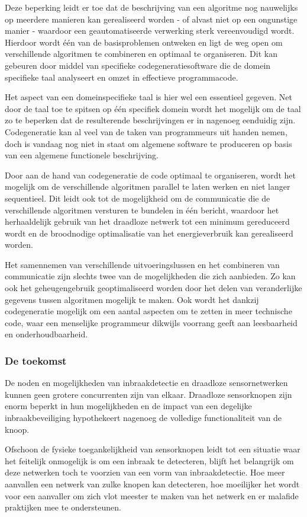\documentclass[DIV=calc,paper=a4,fontsize=11pt,twocolumn,draft]{scrartcl}
\newcommand{\heading}[1]{
\subsubsection*{#1}
\vspace{-2mm}
}
\begin{document}
Deze beperking leidt er toe dat de beschrijving van een algoritme nog
nauwelijks op meerdere manieren kan gerealiseerd worden - of alvast niet op een
ongunstige manier - waardoor een geautomatiseerde verwerking sterk
vereenvoudigd wordt. Hierdoor wordt \'e\'en van de basisproblemen ontweken en
ligt de weg open om verschillende algoritmen te combineren en optimaal
te organiseren. Dit kan gebeuren door middel van specifieke
codegeneratiesoftware die de domein specifieke taal analyseert en omzet in
effectieve programmacode.

Het aspect van een domeinspecifieke taal is hier wel een essentieel gegeven.
Net door de taal toe te spitsen op \'e\'en specifiek domein wordt het mogelijk
om de taal zo te beperken dat de resulterende beschrijvingen er in nagenoeg
eenduidig zijn. Codegeneratie kan al veel van de taken van programmeurs uit
handen nemen, doch is vandaag nog niet in staat om algemene software te
produceren op basis van een algemene functionele beschrijving.

Door aan de hand van codegeneratie de code optimaal te organiseren, wordt het
mogelijk om de verschillende algoritmen parallel te laten werken en niet langer
sequentieel. Dit leidt ook tot de mogelijkheid om de communicatie die de
verschillende algoritmen versturen te bundelen in \'e\'en bericht, waardoor het
herhaaldelijk gebruik van het draadloze netwerk tot een minimum gereduceerd
wordt en de broodnodige optimalisatie van het energieverbruik kan gerealiseerd
worden.

Het samennemen van verschillende uitvoeringslussen en het combineren van
communicatie zijn slechts twee van de mogelijkheden die zich aanbieden. Zo kan
ook het geheugengebruik geoptimaliseerd worden door het delen van veranderlijke
gegevens tussen algoritmen mogelijk te maken. Ook wordt het dankzij
codegeneratie mogelijk om een aantal aspecten om te zetten in meer technische
code, waar een menselijke programmeur dikwijls voorrang geeft aan leesbaarheid
en onderhoudbaarheid.

\heading{De toekomst}

De noden en mogelijkheden van inbraakdetectie en draadloze sensornetwerken
kunnen geen grotere concurrenten zijn van elkaar. Draadloze sensorknopen zijn
enorm beperkt in hun mogelijkheden en de impact van een degelijke
inbraakbeveiliging hypothekeert nagenoeg de volledige functionaliteit van de
knoop.

Ofschoon de fysieke toegankelijkheid van sensorknopen leidt tot een situatie
waar het feitelijk onmogelijk is om een inbraak te detecteren, blijft het
belangrijk om deze netwerken toch te voorzien van een vorm van inbraakdetectie.
Hoe meer aanvallen een netwerk van zulke knopen kan detecteren, hoe moeilijker
het wordt voor een aanvaller om zich vlot meester te maken van het netwerk en
er malafide praktijken mee te ondersteunen.
\end{document}
